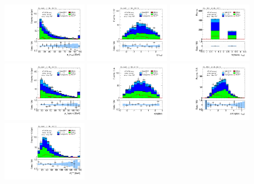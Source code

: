\begin{figure}[tp]
  \centering
  \includegraphics[width=0.32\textwidth]{figures/analysis/vbf-topCR/tau-pt}
  \includegraphics[width=0.32\textwidth]{figures/analysis/vbf-topCR/tau-eta}
  \includegraphics[width=0.32\textwidth]{figures/analysis/vbf-topCR/tau-numTrack}
  \includegraphics[width=0.32\textwidth]{figures/analysis/vbf-topCR/lep-pt-hi}
  \includegraphics[width=0.32\textwidth]{figures/analysis/vbf-topCR/lep-eta}
  \includegraphics[width=0.32\textwidth]{figures/analysis/vbf-topCR/taulep-dR}
  \includegraphics[width=0.32\textwidth]{figures/analysis/vbf-topCR/met-pt-hi}

\end{figure}
